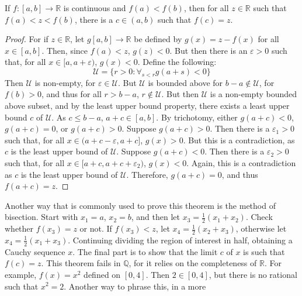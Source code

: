     \begin{theorem}
        If $f:[a,b]\rightarrow\mathbb{R}$ is continuous and $f(a)<f(b)$, then
        for all $z\in\mathbb{R}$ such that $f(a)<z<f(b)$, there is a
        $c\in(a,b)$ such that $f(c)=z$.
    \end{theorem}
    \begin{proof}
        For if $z\in\mathbb{R}$, let $g[a,b]\rightarrow\mathbb{R}$ be defined
        by $g(x)=z-f(x)$ for all $x\in[a,b]$. Then, since $f(a)<z$, $g(z)<0$.
        But then there is an $\varepsilon>0$ such that, for all
        $x\in[a,a+\varepsilon)$, $g(x)<0$. Define the following:
        \begin{equation}
            \mathcal{U}=\{r>0:\forall_{s<r}g(a+s)<0\}
        \end{equation}
        Then $\mathcal{U}$ is non-empty, for $\varepsilon\in\mathcal{U}$. But
        $\mathcal{U}$ is bounded above for $b-a\notin\mathcal{U}$, for
        $f(b)>0$, and thus for all $r>b-a$, $r\notin\mathcal{U}$. But then
        $\mathcal{U}$ is a non-empty bounded above subset, and by the least
        upper bound property, there exists a least upper bound $c$ of
        $\mathcal{U}$. As $c\leq{b-a}$, $a+c\in[a,b]$. By trichotomy, either
        $g(a+c)<0$, $g(a+c)=0$, or $g(a+c)>0$. Suppose $g(a+c)>0$. Then there
        is a $\varepsilon_{1}>0$ such that, for all
        $x\in(a+c-\varepsilon,a+c]$, $g(x)>0$. But this is a contradiction,
        as $c$ is the least upper bound of $\mathcal{U}$. Suppose $g(a+c)<0$.
        Then there is a $\varepsilon_{2}>0$ such that, for all
        $x\in[a+c,a+c+\varepsilon_{2})$, $g(x)<0$. Again, this is a
        contradiction as $c$ is the least upper bound of
        $\mathcal{U}$. Therefore, $g(a+c)=0$, and thus $f(a+c)=z$.
    \end{proof}
    Another way that is commonly used to prove this theorem is the method of
    bisection. Start with $x_{1}=a$, $x_{2}=b$, and then let
    $x_{3}=\tfrac{1}{2}(x_{1}+x_{2})$. Check whether $f(x_{3})=z$ or not. If
    $f(x_{3})<z$, let $x_{4}=\tfrac{1}{2}(x_{2}+x_{3})$, otherwise let
    $x_{4}=\tfrac{1}{2}(x_{1}+x_{3})$. Continuing dividing the region of
    interest in half, obtaining a Cauchy sequence $x$. The final part is to
    show that the limit $c$ of $x$ is such that $f(c)=z$. This theorem fails in
    $\mathbb{Q}$, for it relies on the completeness of $\mathbb{R}$. For
    example, $f(x)=x^{2}$ defined on $[0,4]$. Then $2\in[0,4]$, but there is no
    rational such that $x^{2}=2$. Another way to phrase this, in a more
